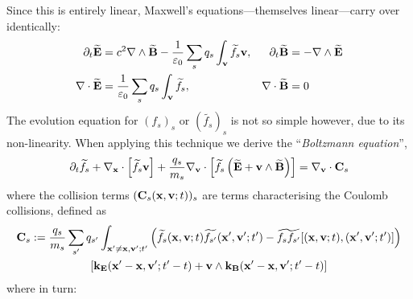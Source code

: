     Since this is entirely linear, Maxwell's equations—themselves linear—carry over identically:
    \begin{align*}
        \partial_{t}\widetilde{\mathbf{E}}  &=  c^{2}\nabla\wedge\widetilde{\mathbf{B}} - \frac{1}{\varepsilon_{0}}\sum_{s}q_{s}\int_{\mathbf{v}}\widetilde{f_{s}}\mathbf{v},  &
        \partial_{t}\widetilde{\mathbf{B}}  &=  - \nabla\wedge\widetilde{\mathbf{E}}  \\
        \nabla\cdot\widetilde{\mathbf{E}}  &=  \frac{1}{\varepsilon_{0}}\sum_{s}q_{s}\int_{\mathbf{v}}\widetilde{f_{s}},  &
        \nabla\cdot\widetilde{\mathbf{B}}  &=  0
    \end{align*}
    The evolution equation for $(f_{s})_{s}$ or $\left(\widetilde{f_{s}}\right)_{s}$ is not so simple however, due to its non-linearity. When applying this technique we derive the ``\emph{Boltzmann equation}'', \BA{[Ref]}
    \begin{equation}\label{eqn:Boltzmann equation}
        \partial_{t}\widetilde{f_{s}} + \nabla_{\mathbf{x}}\cdot\left[\widetilde{f_{s}}\mathbf{v}\right] + \frac{q_{s}}{m_{s}}\nabla_{\mathbf{v}}\cdot\left[\widetilde{f_{s}}\left(\widetilde{\mathbf{E}} + \mathbf{v}\wedge\widetilde{\mathbf{B}}\right)\right]  =   \nabla_{\mathbf{v}}\cdot\mathbf{C}_{s}
    \end{equation}
    where the collision terms $(\mathbf{C}_{s}(\mathbf{x}, \mathbf{v}; t))_{s}$ are terms characterising the Coulomb collisions, defined as
    \begin{multline}\label{eqn:collision operator}
        \bfC_{s}  :=  \frac{q_{s}}{m_{s}}\sum_{s'}q_{s'}\int_{\bfx' \neq \bfx, \bfv'; t'}\left(\widetilde{f_{s}}(\bfx, \bfv; t)\widetilde{f_{s'}}(\bfx', \bfv'; t') - \widetilde{f_{s}f_{s'}}[(\bfx, \bfv; t), (\bfx', \bfv'; t')]\right)  \\
        [\bfk_{\bfE}(\bfx' - \bfx, \bfv'; t' - t) + \bfv\wedge\bfk_{\bfB}(\bfx' - \bfx, \bfv'; t' - t)]
    \end{multline}
    where in turn:
